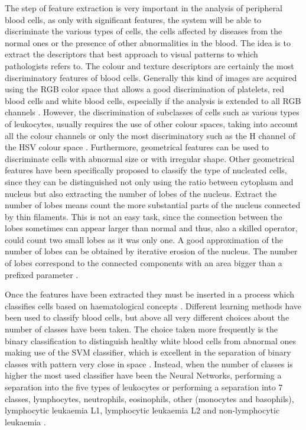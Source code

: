 \documentclass[final,a4paper,12pt,english]{UnicaPhdThesis3}
\begin{document}
	The step of feature extraction is very important in the analysis of peripheral blood cells, as only with significant features, the system will be able to discriminate the various types of cells, the cells affected by diseases from the normal ones or the presence of other abnormalities in the blood. The idea is to extract the descriptors that best approach to visual patterns to which pathologists refers to. The colour and texture descriptors are certainly the most discriminatory features of blood cells. Generally this kind of images are acquired using the RGB color space that allows a good discrimination of platelets, red blood cells and white blood cells, especially if the analysis is extended to all RGB channels \cite{Angulo}. However, the discrimination of subclasses of cells such as various types of leukocytes, usually requires the use of other colour spaces, taking into account all the colour channels or only the most discriminatory such as the H channel of the HSV colour space \cite{Hengen}. Furthermore, geometrical features can be used to discriminate cells with abnormal size or with irregular shape. Other geometrical features have been specifically proposed to classify the type of nucleated cells, since they can be distinguished not only using the ratio between cytoplasm and nucleus \cite{Piuri, Sco05, Sco06} but also extracting the number of lobes of the nucleus. Extract the number of lobes means count the more substantial parts of the nucleus connected by thin filaments. This is not an easy task, since the connection between the lobes sometimes can appear larger than normal and thus, also a skilled operator, could count two small lobes as it was only one. A good approximation of the number of lobes can be obtained by iterative erosion of the nucleus. The number of lobes correspond to the connected components with an area bigger than a prefixed parameter \cite{Piuri}.  
	
	Once the features have been extracted they must be inserted in a process which classifies cells based on haematological concepts \cite{Biondi, Serbouti}. Different learning methods have been used to classify blood cells, but above all very different choices about the number of classes have been taken. The choice taken more frequently is the binary classification to distinguish healthy white blood cells from abnormal ones making use of the SVM classifier, which is excellent in the separation of binary classes with pattern very close in space \cite{Mohapatra10a, Mohapatra10b, Mohapatra10c, Mohapatra14}. Instead, when the number of classes is higher the most used classifier have been the Neural Networks, performing a separation into the five types of leukocytes \cite{Sco06} or performing a separation into 7 classes, lymphocytes, neutrophils, eosinophils, other (monocytes and basophils), lymphocytic leukaemia L1, lymphocytic leukaemia L2 and non-lymphocytic leukaemia \cite{Buavirat}. 
	
\end{document}
